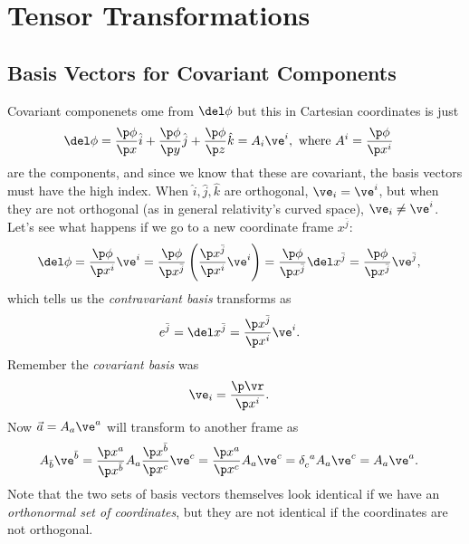 \documentclass[a4paper, 11pt, normalem]{report}
\begin{document}
\chapter{Tensor Transformations}
\section{Basis Vectors for Covariant Components}
Covariant componenets ome from $\del\phi$ but this in Cartesian coordinates is just
\begin{align}
    \del\phi &= \frac{\p\phi}{\p x}\hat{i} + \frac{\p\phi}{\p y}\hat{j} + \frac{\p\phi}{\p z}\hat{k} = A_i\ve^i, \text{ where } A^i = \frac{\p\phi}{\p x^i}
\end{align}
are the components, and since we know that these are covariant, the basis vectors must have the high index. 
When $\hat{i},\hat{j},\hat{k}$ are orthogonal, $\ve_i=\ve^i$, but when they are not orthogonal (as in general relativity's curved space), $\ve_i\neq\ve^i$.
Let's see what happens if we go to a new coordinate frame $x^{\bar{j}}$:
\begin{align}
    \del\phi &= \frac{\p\phi}{\p x^i}\ve^i = \frac{\p\phi}{\p x^{\bar{j}}}\left(\frac{\p x^{\bar{j}}}{\p x^i}\ve^i\right) = \frac{\p\phi}{\p x^{\bar{j}}}\del x^{\bar{j}} = \frac{\p\phi}{\p x^{\bar{j}}}\ve^{\bar{j}},
\end{align}
which tells us the \emph{contravariant basis} transforms as
\begin{align}
    e^{\bar{j}} &= \del x^{\bar{j}} = \frac{\p x^{\bar{j}}}{\p x^i}\ve^i.
\end{align}
Remember the \emph{covariant basis} was
\begin{align}
    \ve_i &= \frac{\p\vr}{\p x^i}.
\end{align}
Now $\vec{a}=A_a\ve^a$ will transform to another frame as
\begin{align}
    A_{\bar{b}}\ve^{\bar{b}} &= \frac{\p x^a}{\p x^{\bar{b}}}A_a\frac{\p x^{\bar{b}}}{\p x^c}\ve^c = \frac{\p x^a}{\p x^c}A_a\ve^c = \tensor{\delta}{_c^a}A_a\ve^c = A_a\ve^a.
\end{align}
Note that the two sets of basis vectors themselves look identical if we have an \emph{orthonormal set of coordinates}, but they are not identical if the coordinates are not orthogonal. 
\end{document}
